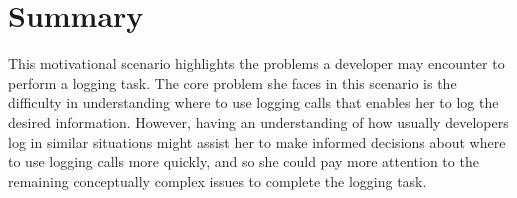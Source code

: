 \section{Summary}  \label{ch2-summary}

This motivational scenario highlights the problems a developer may encounter to perform a logging task. 
The core problem she faces in this scenario is the difficulty in understanding where to use logging calls that enables her to log the desired information. However, having an understanding of how usually developers log in similar situations might assist her to make informed decisions about where to use logging calls more quickly, and so she could pay more attention to the remaining conceptually complex issues to complete the logging task.




